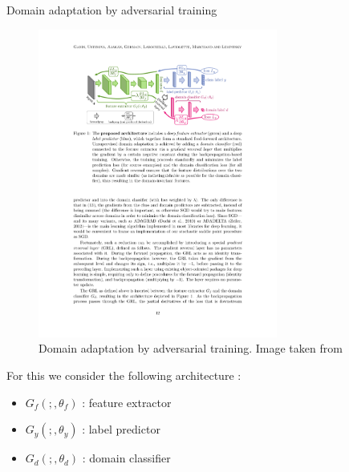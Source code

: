 \documentclass[xcolor=pdftex,dvipsnames,table]{beamer}
\begin{document}
\begin{frame}[noframenumbering]{Domain adaptation by adversarial training}
\begin{figure}[htb]
   \centering
   \includegraphics[width=0.7\textwidth]{../graphics/domain_adaptation.pdf}
   \caption{Domain adaptation by adversarial training. Image taken from \cite{Ganin2016}}
\end{figure}
For this we consider the following architecture \cite{Ganin2016}: 
\begin{itemize}
   \item $G_f(;,\theta_f)$ : feature extractor
   \item $G_y(;,\theta_y)$ : label predictor 
   \item $G_d(;,\theta_d)$ : domain classifier
\end{itemize}
\end{frame}
\end{document}
